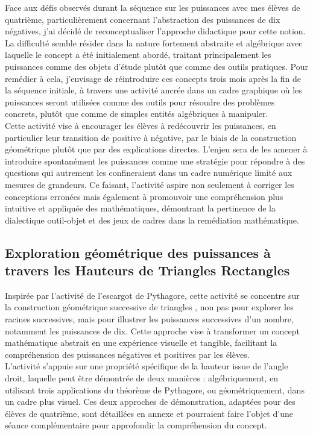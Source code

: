 Face aux défis observés durant la séquence sur les puissances avec mes élèves de quatrième,
particulièrement concernant l'abstraction des puissances de dix négatives,
j'ai décidé de reconceptualiser l'approche didactique pour cette notion.
La difficulté semble résider dans la nature fortement abstraite et algébrique avec laquelle le concept a été initialement abordé,
traitant principalement les puissances comme des objets d'étude plutôt que comme des outils pratiques.
Pour remédier à cela,
j'envisage de réintroduire ces concepts trois mois après la fin de la séquence initiale,
à travers une activité  ancrée dans un cadre graphique où les puissances seront utilisées comme des outils pour résoudre des problèmes concrets,
plutôt que comme de simples entités algébriques à manipuler.\\

Cette activité vise à encourager les élèves à redécouvrir les puissances,
en particulier leur transition de positive à négative,
par le biais de la construction géométrique plutôt que par des explications directes.
L'enjeu sera de les amener à introduire spontanément les puissances comme une stratégie pour répondre à des questions qui autrement les confineraient dans un cadre numérique limité aux mesures de grandeurs.
Ce faisant,
l'activité aspire non seulement à corriger les conceptions erronées mais également à promouvoir une compréhension plus intuitive et appliquée des mathématiques,
démontrant la pertinence de la dialectique outil-objet et des jeux de cadres dans la remédiation mathématique.

\subsection{Exploration géométrique des puissances à travers les Hauteurs de Triangles Rectangles}

Inspirée par l'activité de l'escargot de Pythagore,
cette activité se concentre sur la construction géométrique successive de triangles \cite{villemin},
non pas pour explorer les racines successives,
mais pour illustrer les puissances successives d'un nombre,
notamment les puissances de dix.
Cette approche vise à transformer un concept mathématique abstrait en une expérience visuelle et tangible,
facilitant la compréhension des puissances négatives et positives par les élèves.\\

L'activité s'appuie sur une propriété  spécifique de la hauteur issue de l'angle
droit, laquelle peut être démontrée de deux manières : algébriquement, en
utilisant trois applications du théorème de Pythagore, ou géométriquement, dans
un cadre plus visuel. Ces deux approches de démonstration, adaptées pour des
élèves de quatrième, sont détaillées en annexe et pourraient faire l'objet d'une
séance complémentaire pour approfondir la compréhension du concept.

